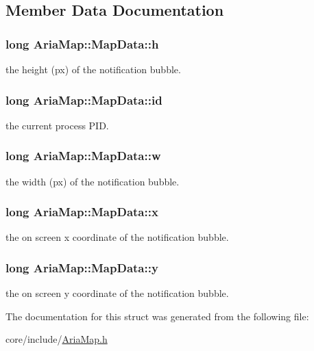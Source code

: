 \subsection{Member Data Documentation}
\hypertarget{structAriaMap_1_1MapData_a65e3176b551d33a62fffc6cba6050181}{}
\subsubsection[{h}]{\setlength{\rightskip}{0pt plus 5cm}long Aria\+Map\+::\+Map\+Data\+::h}\label{structAriaMap_1_1MapData_a65e3176b551d33a62fffc6cba6050181}
the height (px) of the notification bubble. \hypertarget{structAriaMap_1_1MapData_a21c9abfc75f67b38f3b0efd7c5bf09b8}{}
\subsubsection[{id}]{\setlength{\rightskip}{0pt plus 5cm}long Aria\+Map\+::\+Map\+Data\+::id}\label{structAriaMap_1_1MapData_a21c9abfc75f67b38f3b0efd7c5bf09b8}
the current process P\+I\+D. \hypertarget{structAriaMap_1_1MapData_a22bf275975657b892ee03037af434477}{}
\subsubsection[{w}]{\setlength{\rightskip}{0pt plus 5cm}long Aria\+Map\+::\+Map\+Data\+::w}\label{structAriaMap_1_1MapData_a22bf275975657b892ee03037af434477}
the width (px) of the notification bubble. \hypertarget{structAriaMap_1_1MapData_a3100f37ef7d7987aa94a623419fb1bda}{}
\subsubsection[{x}]{\setlength{\rightskip}{0pt plus 5cm}long Aria\+Map\+::\+Map\+Data\+::x}\label{structAriaMap_1_1MapData_a3100f37ef7d7987aa94a623419fb1bda}
the on screen x coordinate of the notification bubble. \hypertarget{structAriaMap_1_1MapData_a258d11931a11d189e4ae1c671a0fcdef}{}
\subsubsection[{y}]{\setlength{\rightskip}{0pt plus 5cm}long Aria\+Map\+::\+Map\+Data\+::y}\label{structAriaMap_1_1MapData_a258d11931a11d189e4ae1c671a0fcdef}
the on screen y coordinate of the notification bubble. 

The documentation for this struct was generated from the following file\+:\begin{DoxyCompactItemize}
\item 
core/include/\hyperlink{AriaMap_8h}{Aria\+Map.\+h}\end{DoxyCompactItemize}
